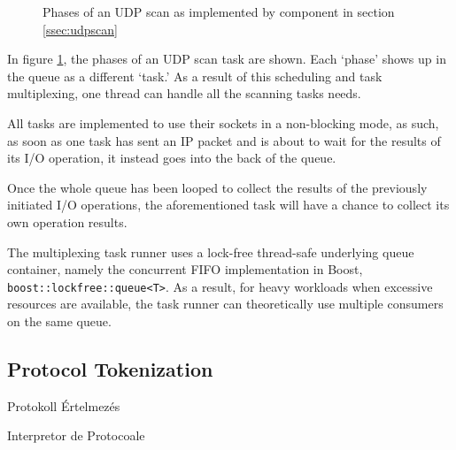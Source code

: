 \documentclass[a4paper,12pt]{article}
\newcommand\subsectionhu[1]{\addcontentsline{toc.hu}{subsection} {\protect\numberline{\thesubsection} #1}}
\newcommand\subsectionro[1]{\addcontentsline{toc.ro}{subsection} {\protect\numberline{\thesubsection} #1}}
\begin{document}
	\begin{figure}[!htbp]
		\centering
		\caption{Phases of an UDP scan as implemented by component in section \ref{ssec:udpscan}}
		\label{taskudp}
	\end{figure}
	
	In figure \ref{taskudp}, the phases of an UDP scan task are shown. Each `phase' shows up in the queue as a different `task.' As a result of this scheduling and task multiplexing, one thread can handle all the scanning tasks needs.
	
	All tasks are implemented to use their sockets in a non-blocking mode, as such, as soon as one task has sent an IP packet and is about to wait for the results of its I/O operation, it instead goes into the back of the queue.
	
	Once the whole queue has been looped to collect the results of the previously initiated I/O operations, the aforementioned task will have a chance to collect its own operation results.
	
	The multiplexing task runner uses a lock-free thread-safe underlying queue container, namely the concurrent FIFO implementation in Boost, \texttt{boost::lockfree::queue<T>}. As a result, for heavy workloads when excessive resources are available, the task runner can theoretically use multiple consumers on the same queue.
	
\subsection{Protocol Tokenization} \label{ssec:tokenizer}
\subsectionhu{Protokoll Értelmezés} \subsectionro{Interpretor de Protocoale}
	
\end{document}
